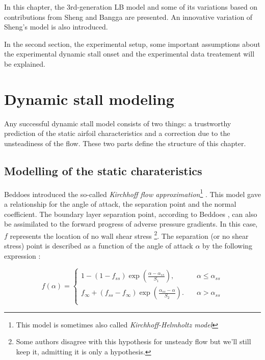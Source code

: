 In this chapter, the 3rd-generation LB model \cite{leishman_semi-empirical_1989} and some of its variations based on contributions from Sheng \cite{sheng_modified_2008} and Bangga \cite{bangga_improved_2020} are presented. An innovative variation of Sheng's model is also introduced. 

In the second section, the experimental setup, some important assumptions about the experimental dynamic stall onset and the experimental data treatement will be explained.

\section{Dynamic stall modeling}
\label{section:ds_model}
Any successful dynamic stall model consists of two things: a trustworthy prediction of the static airfoil characteristics and a correction due to the unsteadiness of the flow. These two parts define the structure of this chapter. 

\subsection{Modelling of the static charateristics}
\label{section:kirchhoff}

Beddoes introduced the so-called \textit{Kirchhoff flow approximation}\footnote{This model is sometimes also called \textit{Kirchhoff-Helmholtz model}} \cite{beddoes_representation_1983}. This model gave a relationship for the angle of attack, the separation point and the normal coefficient. The boundary layer separation point, according to Beddoes \cite{beddoes_representation_1983}, can also be assimilated to the forward progress of adverse pressure gradients. In this case, $f$ represents the location of no wall shear stress \footnote{Some authors \cite{serra_exact_2018} disagree with this hypothesis for unsteady flow but we'll still keep it, admitting it is only a hypothesis.}.
The separation (or no shear stress) point is described as a function of the angle of attack $\alpha$ by the following expression : 

\begin{equation}
	f(\alpha) = 
		\begin{cases}
		1-(1-f_{ss})\exp(\frac{\alpha-\alpha_{ss}}{S_1}), &\quad \alpha \leq \alpha_{ss}\\
		f_{\infty}+(f_{ss}-f_{\infty})\exp(\frac{\alpha_{ss}-\alpha}{S_2}). &\quad \alpha > \alpha_{ss}\\
		\end{cases}
	\label{eq:seppoint}
\end{equation}

